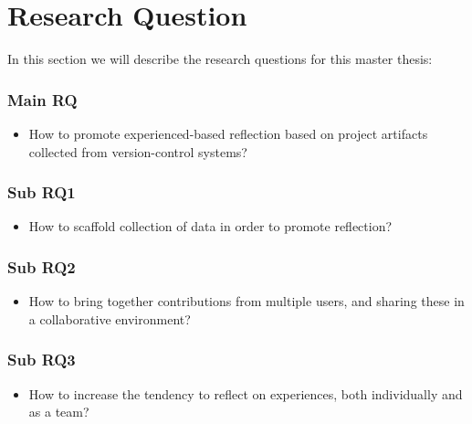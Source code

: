 \section{Research Question}
In this section we will describe the research questions for this master thesis:
\subsubsection{Main RQ}
\begin{itemize}
	\item How to promote experienced-based reflection based on project artifacts collected from version-control systems?
\end{itemize}
\subsubsection{Sub RQ1}
\begin{itemize}
	\item How to scaffold collection of data in order to promote reflection?
\end{itemize}

\subsubsection{Sub RQ2}
\begin{itemize}
	\item How to bring together contributions from multiple users, and sharing these in a collaborative environment?
\end{itemize}

\subsubsection{Sub RQ3}
\begin{itemize}
	\item How to increase the tendency to reflect on experiences, both individually and as a team? 
\end{itemize}